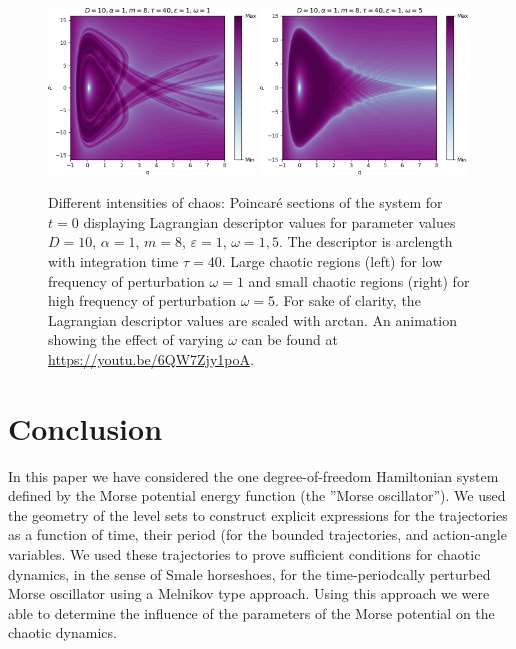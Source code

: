 \documentclass{ws-ijbc}
\begin{document}
\begin{figure}
 \centering
 \includegraphics[width=0.49\textwidth]{om1_120_trim}
 \includegraphics[width=0.49\textwidth]{om5_120_trim}
 \caption{Different intensities of chaos: Poincar{\'e} sections of the system for $t=0$ displaying Lagrangian descriptor values for parameter values $D=10$, $\alpha=1$, $m=8$, $\varepsilon=1$, $\omega=1, 5$. The descriptor is arclength with integration time $\tau=40$. Large chaotic regions (left) for low frequency of perturbation $\omega=1$ and small chaotic regions (right) for high frequency of perturbation $\omega=5$. For sake of clarity, the Lagrangian descriptor values are scaled with arctan. An animation showing the effect of varying $\omega$ can be found at \url{https://youtu.be/6QW7Zjy1poA}. %
 }
 \label{fig:ld}
\end{figure}


\section{Conclusion}
\label{sec:concl}

In this paper we have considered the one degree-of-freedom Hamiltonian system defined by the Morse potential energy function (the ''Morse oscillator''). We used the geometry of the level sets to construct explicit expressions for the trajectories as a function of time, their period (for the bounded trajectories, and action-angle variables. We used these trajectories to prove sufficient conditions for chaotic dynamics, in the sense of Smale horseshoes, for the time-periodcally perturbed Morse oscillator using a Melnikov type approach. Using this approach we were able to determine the influence of the parameters of the Morse potential on the chaotic dynamics.
\end{document}
